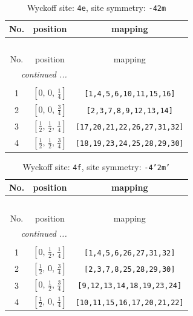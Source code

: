 \documentclass[fleqn,8pt]{jsarticle}
\begin{document}
\renewcommand{\arraystretch}{1.2}
\begin{longtable}{ccc}
\caption{Wyckoff site: {\tt 4e}, site symmetry: {\tt -42m}}
 \\
 \hline \hline
No. & position & mapping \\ \hline \endfirsthead

\multicolumn{2}{l}{\tablename\ \thetable{}} \\
 \hline \hline
No. & position & mapping \\ \hline \endhead

 \hline \hline
\multicolumn{2}{r}{\footnotesize\it continued ...} \\ \endfoot

 \hline \hline
\multicolumn{2}{r}{} \\ \endlastfoot

1 & $\left[ 0,\, 0,\, \frac{1}{4} \right]$ & {\tt [1,4,5,6,10,11,15,16]} \\ \hline
2 & $\left[ 0,\, 0,\, \frac{3}{4} \right]$ & {\tt [2,3,7,8,9,12,13,14]} \\ \hline
3 & $\left[ \frac{1}{2},\, \frac{1}{2},\, \frac{1}{4} \right]$ & {\tt [17,20,21,22,26,27,31,32]} \\ \hline
4 & $\left[ \frac{1}{2},\, \frac{1}{2},\, \frac{3}{4} \right]$ & {\tt [18,19,23,24,25,28,29,30]} \\
\end{longtable}
\renewcommand{\arraystretch}{1.2}
\begin{longtable}{ccc}
\caption{Wyckoff site: {\tt 4f}, site symmetry: {\tt -4'2m'}}
 \\
 \hline \hline
No. & position & mapping \\ \hline \endfirsthead

\multicolumn{2}{l}{\tablename\ \thetable{}} \\
 \hline \hline
No. & position & mapping \\ \hline \endhead

 \hline \hline
\multicolumn{2}{r}{\footnotesize\it continued ...} \\ \endfoot

 \hline \hline
\multicolumn{2}{r}{} \\ \endlastfoot

1 & $\left[ 0,\, \frac{1}{2},\, \frac{1}{4} \right]$ & {\tt [1,4,5,6,26,27,31,32]} \\ \hline
2 & $\left[ \frac{1}{2},\, 0,\, \frac{3}{4} \right]$ & {\tt [2,3,7,8,25,28,29,30]} \\ \hline
3 & $\left[ 0,\, \frac{1}{2},\, \frac{3}{4} \right]$ & {\tt [9,12,13,14,18,19,23,24]} \\ \hline
4 & $\left[ \frac{1}{2},\, 0,\, \frac{1}{4} \right]$ & {\tt [10,11,15,16,17,20,21,22]} \\
\end{longtable}
\end{document}
